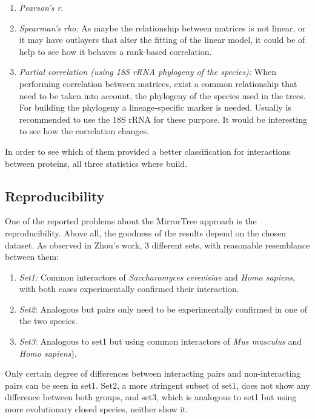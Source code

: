 \documentclass[11pt]{article}
\begin{document}
\begin{enumerate}
\setlength{\itemsep}{1pt}
	\item \textit{Pearson's r}\cite{Pazos2001}.
	\item \textit{Spearman's rho:} As maybe the relationship between matrices is not linear, or it may have outlayers that alter the fitting of the linear model, it could be of help to see how it behaves a rank-based correlation.
	\item \textit{Partial correlation (using 18S rRNA phylogeny of the species):}\cite{Sato2005} When performing correlation between matrices, exist a common relationship that need to be taken into account, the phylogeny of the species used in the trees. For building the phylogeny a lineage-specific marker is needed. Usually is recommended to use the 18S rRNA for these purpose\cite{Sato2005}. It would be interesting to see how the correlation changes.
\end{enumerate}

In order to see which of them provided a better classification for interactions between proteins, all three statistics where build.

\subsection{Reproducibility}
One of the reported problems about the MirrorTree approach is the reproducibility. Above all, the goodness of the results depend on the chosen dataset. As observed in Zhou's work\cite{Zhou13}, 3 different sets, with reasonable resemblance between them:
\begin{enumerate}
\setlength{\itemsep}{1pt}
	\item \textit{Set1:} Common interactors of \textit{Saccharomyces cerevisiae} and \textit{Homo sapiens}, with both cases experimentally confirmed their interaction.
	\item \textit{Set2}: Analogous but pairs only need to be experimentally confirmed in one of the two species.
	\item \textit{Set3}: Analogous to set1 but using common interactors of \textit{Mus musculus} and   \textit{Homo sapiens}).
\end{enumerate}
Only certain degree of differences between interacting pairs and non-interacting pairs can be seen in set1. Set2, a more stringent subset of set1, does not show any difference between both groups, and set3, which is analogous to set1 but using more evolutionary closed species, neither show it.
\end{document}
